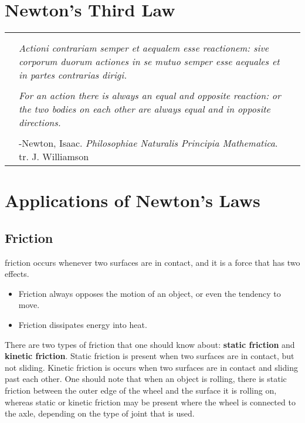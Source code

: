 	 
	
	\section{Newton's Third Law}
		\begin{tabular}{p{.75in} p{4.5in} p{.75in}}
		&  &  \\
		& & \\
		& \textit{Actioni contrariam semper et aequalem esse reactionem: sive corporum duorum actiones in se mutuo semper esse aequales et in partes contrarias dirigi. } & \\
		& & \\
		& \textit{For an action there is always an equal and opposite reaction: or the two bodies on each other are always equal and in opposite directions. } & \\
		& & \\
		 & {-Newton, Isaac.  \textit{Philosophiae Naturalis Principia Mathematica}.  tr. J. Williamson} & \\
		
	\end{tabular}
	
	\section{Applications of Newton's Laws}
		\subsection{Friction}
		\gls{friction} occurs whenever two surfaces are in contact, and it is a force that has two effects.  
		\begin{itemize}
			\item Friction always opposes the motion of an object, or even the tendency to move.
			\item Friction dissipates energy into heat.
		\end{itemize}
		
		 
		There are two types of friction that one should know about: \textbf{static friction} and \textbf{kinetic friction}.  Static friction is present when two surfaces are in contact, but not sliding.  Kinetic friction is occurs when two surfaces are in contact and sliding past each other.  One should note that when an object is rolling, there is static friction between the outer edge of the wheel and the surface it is rolling on, whereas static or kinetic friction may be present where the wheel is connected to the axle, depending on the type of joint that is used.  
		
